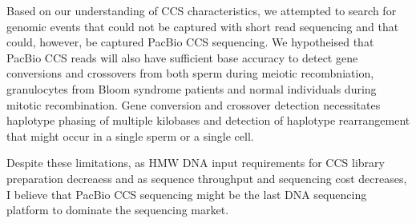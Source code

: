 Based on our understanding of CCS characteristics, we attempted to search for genomic events that could not be captured with short read sequencing and that could, however, be captured PacBio CCS sequencing. We hypotheised that PacBio CCS reads will also have sufficient base accuracy to detect gene conversions and crossovers from both sperm during meiotic recombniation, granulocytes from Bloom syndrome patients and normal individuals during mitotic recombination. Gene conversion and crossover detection necessitates haplotype phasing of multiple kilobases and detection of haplotype rearrangement that might occur in a single sperm or a single cell. 


Despite these limitations, as HMW DNA input requirements for CCS library preparation decreaess and as sequence throughput and sequencing cost decreases, I believe that PacBio CCS sequencing might be the last DNA sequencing platform to dominate the sequencing market.









